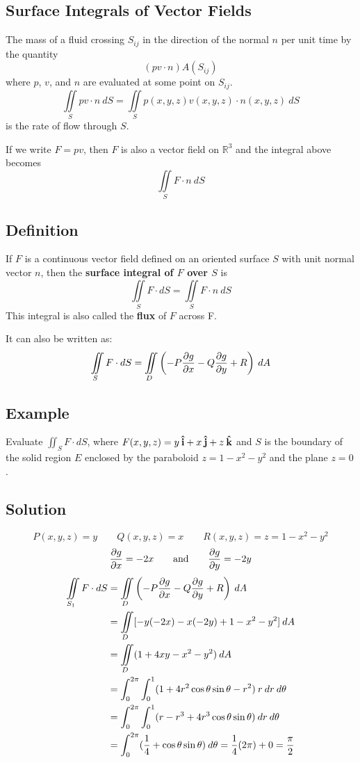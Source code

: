 \subsection*{Surface Integrals of Vector Fields}
The mass of a fluid crossing $S_{ij}$ in the direction of the normal $n$ per unit
time by the quantity
$$(pv\cdot n)A(S_{ij})$$
where $p$, $v$, and $n$ are evaluated at some point on $S_{ij}$.
$$\iint\limits_S pv\cdot n\:dS=\iint\limits_S p(x,y,z)v(x,y,z)\cdot n(x,y,z)\:dS$$
is the rate of flow through $S$.

If we write $F=pv$, then $F$ is also a vector field on $\mathbb{R}^3$ and the integral above becomes
$$\iint\limits_S F\cdot n\:dS$$

\subsection*{Definition}
If  $F$ is a continuous vector field defined on an oriented surface $S$ with unit normal
vector $n$, then the \textbf{surface integral of $F$ over $S$} is
$$\iint\limits_S F\cdot dS=\iint\limits_S F\cdot n\:dS$$
This integral is also called the \textbf{flux} of $F$ across F.

It can also be written as:
$$\iint\limits_S F\cdot dS=\iint\limits_D\left(-P\pdv{g}{x}-Q\pdv{g}{y}+R\right)\:dA$$

\subsection*{Example}
Evaluate $\iint_S F\cdot dS$, where $F(x,y,z)=y\:\boldsymbol{\hat{\textbf{i}}}+x\:\boldsymbol{\hat{\textbf{j}}}+z\:\boldsymbol{\hat{\textbf{k}}}$ and $S$ is the
boundary of the solid region $E$ enclosed by the paraboloid $z=1-x^2-y^2$ and the plane $z=0$.

\subsection*{Solution}
$$P(x,y,z)=y \qquad Q(x,y,z)=x \qquad R(x,y,z)=z=1-x^2-y^2$$
$$\pdv{g}{x}=-2x \qquad \text{and} \qquad \pdv{g}{y}=-2y$$
\begin{align*}
        \iint\limits_{S_1} F\cdot dS & =\iint\limits_D\left(-P\pdv{g}{x}-Q\pdv{g}{y}+R\right)\:dA                                      \\
                                     & =\iint\limits_D[-y(-2x)-x(-2y)+1-x^2-y^2]\:dA                                                   \\
                                     & =\iint\limits_D(1+4xy-x^2-y^2)\:dA                                                              \\
                                     & =\int_0^{2\pi}\int_0^1(1+4r^2\cos{\theta}\sin{\theta}-r^2)\:r\:dr\:d\theta                      \\
                                     & =\int_0^{2\pi}\int_0^1(r-r^3+4r^3\cos{\theta}\sin{\theta})\:dr\:d\theta                         \\
                                     & =\int_0^{2\pi}(\frac{1}{4}+\cos{\theta}\sin{\theta})\:d\theta=\frac{1}{4}(2\pi)+0=\frac{\pi}{2}
\end{align*}

